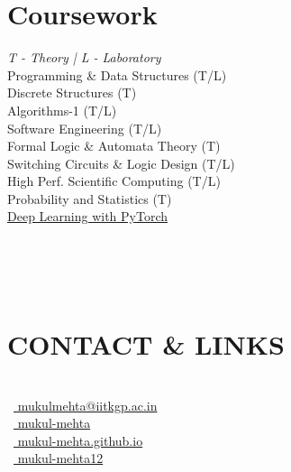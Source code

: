 \documentclass[]{deedy-resume-openfont}
\begin{document}
\begin{minipage}[t]{0.33\textwidth}
\section{Coursework}
\emph{T - Theory | L - Laboratory}\\
Programming \& Data Structures (T/L)\\
Discrete Structures (T)\\
Algorithms-1 (T/L) \\
Software Engineering (T/L) \\
Formal Logic \& Automata Theory (T) \\
Switching Circuits \& Logic Design (T/L) \\
High Perf. Scientific Computing (T/L) \\ 
Probability and Statistics (T) \\
\sectionsep
{}
\href{https://www.udacity.com/course/deep-learning-pytorch--ud188}{Deep Learning with PyTorch}

\\~\\~\\

\section{CONTACT \& LINKS} 
\\
\faEnvelope\ {\href{mailto:mukul\textunderscore mehta@iitkgp.ac.in}{ mukul\textunderscore mehta@iitkgp.ac.in}}\\
\faGithub\ {\href{https://github.com/mukul-mehta}{ mukul-mehta}}\\
\faGlobe\ {\href{https://mukul-mehta.github.io/}{ mukul-mehta.github.io}}\\
\faLinkedinSquare\ {\href{https://www.linkedin.com/in/mukul-mehta12}{ mukul-mehta12}}\\
\\
\sectionsep
 \\~\\
 
%
%

\end{minipage} 
\hfill
\end{document}

